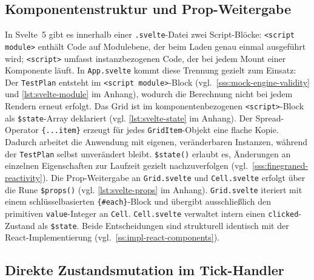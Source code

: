 \subsection{Komponentenstruktur und Prop-Weitergabe}
\label{ss:impl-svelte-components}

In Svelte~5 gibt es innerhalb einer \texttt{.svelte}-Datei zwei Script-Blöcke: \texttt{<script module>} enthält Code auf Modulebene, der beim Laden genau einmal ausgeführt wird; \texttt{<script>} umfasst instanzbezogenen Code, der bei jedem Mount einer Komponente läuft. In \texttt{App.svelte} kommt diese Trennung gezielt zum Einsatz: Der \texttt{TestPlan} entsteht im \texttt{<script module>}-Block (vgl.~\cref{sss:mock-engine-validity} und \cref{lst:svelte-module} im Anhang), wodurch die Berechnung nicht bei jedem Rendern erneut erfolgt. Das Grid ist im komponentenbezogenen \texttt{<script>}-Block als \texttt{\$state}-Array deklariert (vgl. \cref{lst:svelte-state} im Anhang). Der Spread-Operator \texttt{\{...item\}} erzeugt für jedes \texttt{GridItem}-Objekt eine flache Kopie. Dadurch arbeitet die Anwendung mit eigenen, veränderbaren Instanzen, während der \texttt{TestPlan} selbst unverändert bleibt. \texttt{\$state()} erlaubt es, Änderungen an einzelnen Eigenschaften zur Laufzeit gezielt nachzuverfolgen (vgl.~\cref{sss:finegraned-reactivity}). Die Prop-Weitergabe an \texttt{Grid.svelte} und \texttt{Cell.svelte} erfolgt über die Rune \texttt{\$props()} (vgl. \cref{lst:svelte-props} im Anhang). \texttt{Grid.svelte} iteriert mit einem schlüsselbasierten \texttt{\{\#each\}}-Block und übergibt ausschließlich den primitiven \texttt{value}-Integer an \texttt{Cell}. \texttt{Cell.svelte} verwaltet intern einen \texttt{clicked}-Zustand als \texttt{\$state}. Beide Entscheidungen sind strukturell identisch mit der React-Implementierung (vgl.~\cref{ss:impl-react-components}).

\subsection{Direkte Zustandsmutation im Tick-Handler}
\label{ss:impl-svelte-update}

